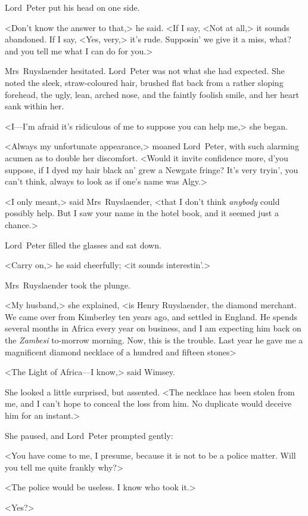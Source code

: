 Lord~Peter put his head on one side.

<Don't know the answer to that,> he said. <If I say, <Not at all,> it sounds abandoned. If I say, <Yes, very,> it's rude. Supposin' we give it a miss, what? and you tell me what I can do for you.>

Mrs~Ruyslaender hesitated. Lord~Peter was not what she had expected. She noted the sleek, straw-coloured hair, brushed flat back from a rather sloping forehead, the ugly, lean, arched nose, and the faintly foolish smile, and her heart sank within her.

<I—I'm afraid it's ridiculous of me to suppose you can help me,> she began.

<Always my unfortunate appearance,> moaned Lord~Peter, with such alarming acumen as to double her discomfort. <Would it invite confidence more, d'you suppose, if I dyed my hair black an' grew a Newgate fringe? It's very tryin', you can't think, always to look as if one's name was Algy.>

<I only meant,> said Mrs~Ruyslaender, <that I don't think \textit{anybody} could possibly help. But I saw your name in the hotel book, and it seemed just a chance.>

Lord~Peter filled the glasses and sat down.

<Carry on,> he said cheerfully; <it sounds interestin'.>

Mrs~Ruyslaender took the plunge.

<My husband,> she explained, <is Henry Ruyslaender, the diamond merchant. We came over from Kimberley ten years ago, and settled in England. He spends several months in Africa every year on business, and I am expecting him back on the \textit{Zambesi} to-morrow morning. Now, this is the trouble. Last year he gave me a magnificent diamond necklace of a hundred and fifteen stones\longdash>

<The Light of Africa—I know,> said Wimsey.

She looked a little surprised, but assented. <The necklace has been stolen from me, and I can't hope to conceal the loss from him. No duplicate would deceive him for an instant.>

She paused, and Lord~Peter prompted gently:

<You have come to me, I presume, because it is not to be a police matter. Will you tell me quite frankly why?>

<The police would be useless. I know who took it.>

<Yes?>

